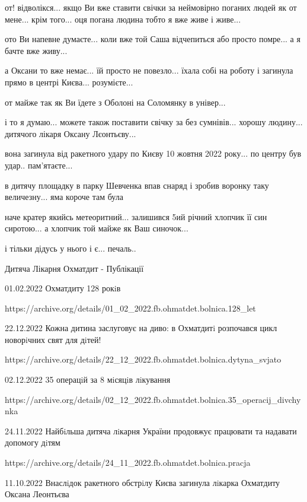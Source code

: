 от! відволікся... якщо Ви вже ставити свічки за неймовірно поганих людей як от мене... крім того... оця погана людина тобто я вже живе і живе...

ото Ви напевне думаєте... коли вже той Саша відчепиться або просто помре... а я бачте вже живу...

а Оксани то вже немає... їй просто не повезло... їхала собі на роботу і загинула прямо в центрі Києва... розумієте...

от майже так як Ви їдете з Оболоні на Соломянку в універ...

і то я думаю...  можете також поставити свічку за без сумнівів... хорошу людину... дитячого лікаря Оксану Лєонтьєву...

вона загинула від ракетного удару по Києву 10 жовтня 2022 року... по центру був удар.. пам'ятаєте...

в дитячу площадку в парку Шевченка впав снаряд і зробив воронку таку величезну... яма короче там була

наче кратер якийсь метеоритний... залишився 5ий річний хлопчик її син сиротою... а хлопчик той майже як Ваш синочок...

і тільки дідусь у нього і є... печаль..


Дитяча Лікарня Охматдит - Публікації

01.02.2022 Охматдиту 128 рокiв

https://archive.org/details/01_02_2022.fb.ohmatdet.bolnica.128_let

22.12.2022 Кожна дитина заслуговує на диво: в Охматдитi розпочався цикл новорiчних свят для дiтей!

https://archive.org/details/22_12_2022.fb.ohmatdet.bolnica.dytyna_svjato

02.12.2022 35 операцiй за 8 мiсяцiв лiкування

https://archive.org/details/02_12_2022.fb.ohmatdet.bolnica.35_operacij_divchynka

24.11.2022 Найбiльша дитяча лiкарня України продовжує працювати та надавати допомогу дiтям

https://archive.org/details/24_11_2022.fb.ohmatdet.bolnica.pracja

11.10.2022 Внаслiдок ракетного обстрiлу Києва загинула лiкарка Охматдиту Оксана Леонтьєва

